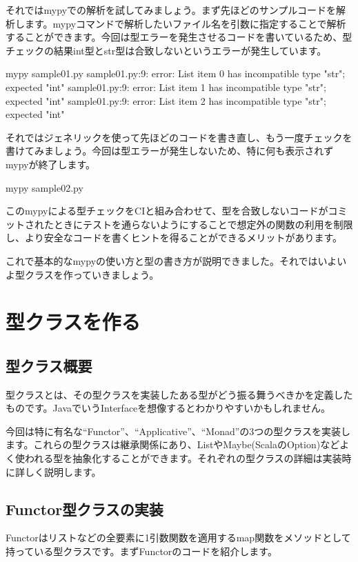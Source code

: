 それではmypyでの解析を試してみましょう。まず先ほどのサンプルコードを解析します。mypyコマンドで解析したいファイル名を引数に指定することで解析することができます。今回は型エラーを発生させるコードを書いているため、型チェックの結果int型とstr型は合致しないというエラーが発生しています。

\begin{bashcode}
mypy sample01.py
sample01.py:9: error: List item 0 has incompatible type "str"; expected "int"
sample01.py:9: error: List item 1 has incompatible type "str"; expected "int"
sample01.py:9: error: List item 2 has incompatible type "str"; expected "int"
\end{bashcode}

それではジェネリックを使って先ほどのコードを書き直し、もう一度チェックを書けてみましょう。今回は型エラーが発生しないため、特に何も表示されずmypyが終了します。


\begin{bashcode}
mypy sample02.py
\end{bashcode}

このmypyによる型チェックをCIと組み合わせて、型を合致しないコードがコミットされたときにテストを通らないようにすることで想定外の関数の利用を制限し、より安全なコードを書くヒントを得ることができるメリットがあります。

これで基本的なmypyの使い方と型の書き方が説明できました。それではいよいよ型クラスを作っていきましょう。

\section{型クラスを作る}
\subsection{型クラス概要}
型クラスとは、その型クラスを実装したある型がどう振る舞うべきかを定義したものです。JavaでいうInterfaceを想像するとわかりやすいかもしれません。

今回は特に有名な``Functor''、``Applicative''、``Monad''の3つの型クラスを実装します。これらの型クラスは継承関係にあり、ListやMaybe(ScalaのOption)などよく使われる型を抽象化することができます。それぞれの型クラスの詳細は実装時に詳しく説明します。

\subsection{Functor型クラスの実装}
Functorはリストなどの全要素に1引数関数を適用するmap関数をメソッドとして持っている型クラスです。まずFunctorのコードを紹介します。


